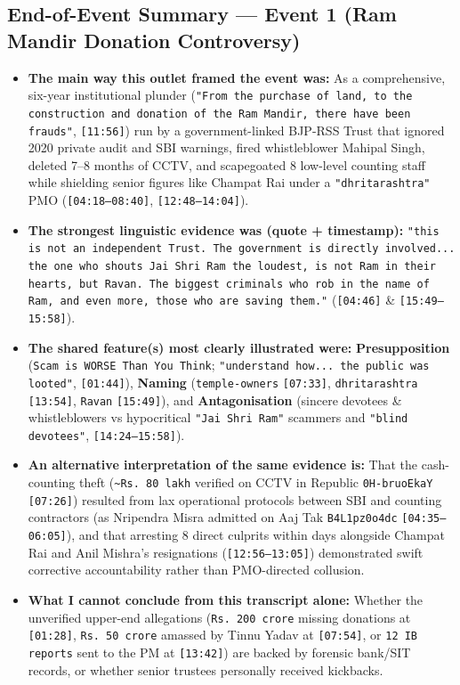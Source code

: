 \documentclass[10pt,a4paper]{article}
\begin{document}
\subsection*{End-of-Event Summary --- Event 1 (Ram Mandir Donation Controversy)}
\begin{itemize}[leftmargin=1.5em, itemsep=3pt, topsep=4pt]
  \item \textbf{The main way this outlet framed the event was:} As a comprehensive, six-year institutional plunder (\texttt{"From the purchase of land, to the construction and donation of the Ram Mandir, there have been frauds"}, \texttt{[11:56]}) run by a government-linked BJP-RSS Trust that ignored 2020 private audit and SBI warnings, fired whistleblower Mahipal Singh, deleted 7--8 months of CCTV, and scapegoated 8 low-level counting staff while shielding senior figures like Champat Rai under a \texttt{"dhritarashtra"} PMO (\texttt{[04:18--08:40]}, \texttt{[12:48--14:04]}).
  \item \textbf{The strongest linguistic evidence was (quote + timestamp):} \texttt{"this is not an independent Trust. The government is directly involved... the one who shouts Jai Shri Ram the loudest, is not Ram in their hearts, but Ravan. The biggest criminals who rob in the name of Ram, and even more, those who are saving them."} (\texttt{[04:46]} \& \texttt{[15:49--15:58]}).
  \item \textbf{The shared feature(s) most clearly illustrated were:} \textbf{Presupposition} (\texttt{Scam is WORSE Than You Think}; \texttt{"understand how... the public was looted"}, \texttt{[01:44]}), \textbf{Naming} (\texttt{temple-owners} \texttt{[07:33]}, \texttt{dhritarashtra} \texttt{[13:54]}, \texttt{Ravan} \texttt{[15:49]}), and \textbf{Antagonisation} (sincere devotees \& whistleblowers vs hypocritical \texttt{"Jai Shri Ram"} scammers and \texttt{"blind devotees"}, \texttt{[14:24--15:58]}).
  \item \textbf{An alternative interpretation of the same evidence is:} That the cash-counting theft (\texttt{\textasciitilde{}Rs.\,80 lakh} verified on CCTV in Republic \texttt{0H-bruoEkaY} \texttt{[07:26]}) resulted from lax operational protocols between SBI and counting contractors (as Nripendra Misra admitted on Aaj Tak \texttt{B4L1pz0o4dc} \texttt{[04:35--06:05]}), and that arresting 8 direct culprits within days alongside Champat Rai and Anil Mishra's resignations (\texttt{[12:56--13:05]}) demonstrated swift corrective accountability rather than PMO-directed collusion.
  \item \textbf{What I cannot conclude from this transcript alone:} Whether the unverified upper-end allegations (\texttt{Rs.\,200 crore} missing donations at \texttt{[01:28]}, \texttt{Rs.\,50 crore} amassed by Tinnu Yadav at \texttt{[07:54]}, or \texttt{12 IB reports} sent to the PM at \texttt{[13:42]}) are backed by forensic bank/SIT records, or whether senior trustees personally received kickbacks.
\end{itemize}
\end{document}
